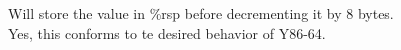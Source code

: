 \documentclass{article}
\begin{document}
Will store the value in \%rsp before decrementing it by 8 bytes. \\
Yes, this conforms to te desired behavior of Y86-64.
\end{document}
